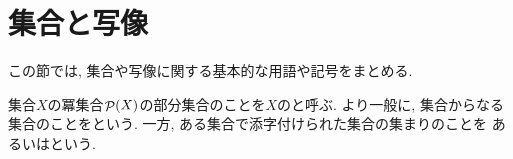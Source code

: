 \documentclass[uplatex, dvipdfmx, a4paper, 12pt, class=jsbook, crop=false]{standalone}
\begin{document}
\section{集合と写像}
\label{sec:sets-and-maps}

この節では, 集合や写像に関する基本的な用語や記号をまとめる.

集合$X$の冪集合$\mathop{\mathcal{P}}\nolimits(X)$の部分集合のことを$X$のと呼ぶ.
より一般に, 集合からなる集合のことをという.
一方, ある集合で添字付けられた集合の集まりのことを
あるいはという.
\end{document}
